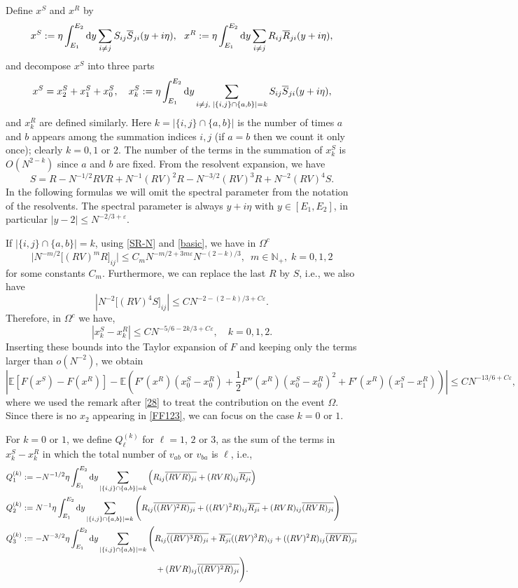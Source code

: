 \documentclass[draft]{article}
\newcommand{\e}{\varepsilon}
\newcommand{\rd}{{\rm d}}
\newcommand{\be}{\begin{equation}}
\newcommand{\ee}{\end{equation}}
\newcommand{\E}{{\mathbb E }}
\newcommand{\N}{{\mathbb N}}
\numberwithin{equation}{section}
\numberwithin{theorem}{section}
\numberwithin{definition}{section}
\numberwithin{remark}{section}
\begin{document}
Define $x^S$ and $x^R$ by 
\be\label{defxs}
x^{S} :=   \eta  \int_{E_1}^{E_2} \rd y \sum_{i\neq j}S_{ij}\overline{S}_{ji}(y+i\eta)
,\,\,\,\,x^{R}:= \eta  \int_{E_1}^{E_2} \rd y \sum_{i\neq j}R_{ij}\overline{R}_{ji}(y+i\eta),
\ee 
and
decompose  $x^S$ into three parts
\be
x^{S} =x^{S}_2+x^S_1+x^S_0, \quad 
x^S_k:=   \eta  \int_{E_1}^{E_2} \rd y  \sum_{i\neq j, \; |\{i,j\}\cap \{a,b\}|=k } 
 S_{ij}\overline{S}_{ji}(y+i\eta),
\ee
and $x^R_k$ are defined similarly. 
Here $k=|\{i,j\}\cap \{a,b\}|$ is the number of times  $a$ and $b$ appears among the
 summation indices  $i,j$ (if $a=b$ then we count it only once); clearly $k=0, 1$ or $2$. 
The number of the  terms in the summation  of  $x^S_k$ is $O(N^{2-k})$ 
since $a$ and $b$ are fixed.  From the resolvent expansion, we have 
\be\label{SR-N}
    S =  R -  N^{-1/2} RVR+  N^{-1} (RV)^2R -  N^{-3/2} (RV)^3R+  N^{-2} (RV)^4S.
\ee
In the following formulas we will omit the spectral parameter from the notation
of the resolvents. The spectral parameter is always $y+i\eta$
with $y\in [E_1,E_2]$, in particular $|y-2|\le N^{-2/3+\e}$.



If $|\{i,j\}\cap \{a,b\}|=k$,   using \eqref{SR-N} and \eqref{basic}, we have in $\Omega^c$
\be\label{51}
\big|N^{-m/2}\big[(RV)^m R\big]_{ij}\big|\leq C_m N^{-m/2+3m\e}N^{- (2-k)/3},\,\,\,  m \in \N_+, 
\; k = 0,1, 2
\ee
for some constants $C_m$. Furthermore, we can replace the last $R$ 
by $S$, i.e.,  we also have 
\be\label{666}
\left|  N^{-2} \big[(RV)^4S\big]_{ij}\right|\leq CN^{-2-(2-k)/3+C\e}.    
\ee
Therefore,   in $\Omega^c$ we have, 
\be
 |x^S_{k}-x^R_{k}|\leq C N^{ -5/6-2k/3+C\e},  \quad k = 0,1, 2.
 \ee
Inserting these bounds into  the Taylor expansion of $F$
and keeping only the terms larger than $o(N^{-2})$,
we obtain  
\be\label{FF123}
\left|\E  [ F(x^S)- F(x^R) ] 
-\E\left( F'(x^R) (x^S_0-x^R_0) 
+\frac12 F''(x^R)  (x^S_0-x^R_0 )^2+ F'(x^R)(x^S_1-x^R_1)\right) \right|\leq CN^{-13/6+C\e},
\ee
where we used the remark after \eqref{28} to treat the contribution on the
event $\Omega$.
Since there is no $x_2$ appearing in \eqref{FF123}, we can focus on the case $k=0$ or $1$. 

For $k=0$ or $1$, we define $Q_\ell^{(k)}$ for $\ell=1$, $2$ or $3$, as the sum of the terms
 in $x^S_k-x^R_k$ in which the total number of $v_{ab}$ or $v_{ba}$ is   $\ell$, i.e., 
\begin{align}
Q_1^{(k)} & :=-N^{-1/2}\eta  \int_{E_1}^{E_2} \rd y  \sum_{|\{i,j\}\cap \{a,b\}|=k }
\left(R_{ij}\overline{(RV R)_{ji}}+(RVR)_{ij}\overline{R_{ji}}\right) \\
Q_2^{(k)} & :=N^{-1}\eta  \int_{E_1}^{E_2} \rd y \sum_{|\{i,j\}\cap \{a,b\}|=k }
\Bigg(R_{ij}\overline{((RV)^2 R)_{ji}}+((RV)^2R)_{ij}\overline{R_{ji}}+
(RVR)_{ij}\overline{(RV R)_{ji}}\Bigg) \\ \label{Q3}
Q_3^{(k)} & :=-N^{-3/2}\eta  \int_{E_1}^{E_2} \rd y \sum_{|\{i,j\}\cap \{a,b\}|=k}
\Bigg(R_{ij}\overline{((RV)^3 R)_{ji}}+\overline{R_{ji}}((RV)^3R)_{ij}+
((RV)^2R)_{ij}\overline{(RV R)_{ji}}\\\nonumber
&\quad\quad\quad\quad\quad\quad\quad\quad\quad\quad\quad\quad\quad\quad\quad\quad
+(RV R)_{ij}\overline{((RV)^2R)_{ji}}\Bigg) .
\end{align}
\end{document}
